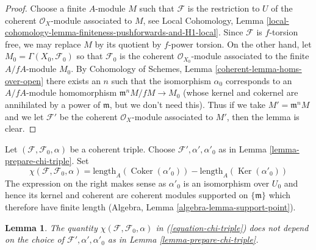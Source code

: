 \documentclass[10pt,a4paper]{amsart}
\theoremstyle{plain}
\newtheorem{lemma}[subsection]{Lemma}
\theoremstyle{definition}
\theoremstyle{remark}
\numberwithin{equation}{subsection}
\def\Ker{\mathop{\mathrm{Ker}}}
\def\Coker{\mathop{\mathrm{Coker}}}
\begin{document}
\begin{proof}
Choose a finite $A$-module $M$ such that $\mathcal{F}$ is the restriction
to $U$ of the coherent $\mathcal{O}_X$-module associated to $M$, see
Local Cohomology, Lemma
\ref{local-cohomology-lemma-finiteness-pushforwards-and-H1-local}.
Since $\mathcal{F}$ is $f$-torsion free, we may replace $M$ by
its quotient by $f$-power torsion.
On the other hand, let $M_0 = \Gamma(X_0, \mathcal{F}_0)$
so that $\mathcal{F}_0$ is the coherent $\mathcal{O}_{X_0}$-module
associated to the finite $A/fA$-module $M_0$.
By Cohomology of Schemes, Lemma \ref{coherent-lemma-homs-over-open}
there exists an $n$ such that the
isomorphism $\alpha_0$ corresponds to an $A/fA$-module homomorphism
$\mathfrak m^n M/fM \to M_0$ (whose kernel and cokernel
are annihilated by a power of $\mathfrak m$, but we don't need this).
Thus if we take $M' = \mathfrak m^n M$ and we let
$\mathcal{F}'$ be the coherent $\mathcal{O}_X$-module
associated to $M'$, then the lemma is clear.
\end{proof}

\noindent
Let $(\mathcal{F}, \mathcal{F}_0, \alpha)$ be a coherent triple.
Choose $\mathcal{F}', \alpha', \alpha'_0$ as in
Lemma \ref{lemma-prepare-chi-triple}. Set
\begin{equation}
\label{equation-chi-triple}
\chi(\mathcal{F}, \mathcal{F}_0, \alpha) =
\text{length}_A(\Coker(\alpha'_0)) - 
\text{length}_A(\Ker(\alpha'_0))
\end{equation}
The expression on the right makes sense as $\alpha'_0$ is an isomorphism
over $U_0$ and hence its kernel and coherent are coherent modules supported
on $\{\mathfrak m\}$ which therefore have finite length
(Algebra, Lemma \ref{algebra-lemma-support-point}).

\begin{lemma}
\label{lemma-well-defined-chi-triple}
The quantity $\chi(\mathcal{F}, \mathcal{F}_0, \alpha)$ in
(\ref{equation-chi-triple}) does not depend on the choice of
$\mathcal{F}', \alpha', \alpha'_0$ as in Lemma \ref{lemma-prepare-chi-triple}.
\end{lemma}
\end{document}
